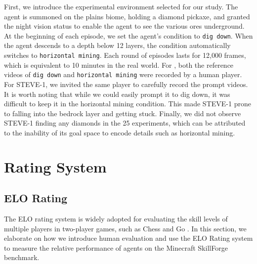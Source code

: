 \documentclass[11pt, a4paper, logo, one column]{craftjarvis}
\begin{document}
First, we introduce the experimental environment selected for our study. The agent is summoned on the plains biome, holding a diamond pickaxe, and granted the night vision status to enable the agent to see the various ores underground. At the beginning of each episode, we set the agent's condition to \texttt{dig down}. When the agent descends to a depth below 12 layers, the condition automatically switches to \texttt{horizontal mining}. Each round of episodes lasts for 12,000 frames, which is equivalent to 10 minutes in the real world. For \agent, both the reference videos of \texttt{dig down} and \texttt{horizontal mining} were recorded by a human player. For STEVE-1, we invited the same player to carefully record the prompt videos. It is worth noting that while we could easily prompt it to dig down, it was difficult to keep it in the horizontal mining condition. This made STEVE-1 prone to falling into the bedrock layer and getting stuck. Finally, we did not observe STEVE-1 finding any diamonds in the 25 experiments, which can be attributed to the inability of its goal space to encode details such as horizontal mining. 


\section{Rating System} \label{appendix:elo}

\subsection{ELO Rating}

The ELO rating system is widely adopted for evaluating the skill levels of multiple players in two-player games, such as Chess and Go \citep{alphago}. In this section, we elaborate on how we introduce human evaluation and use the ELO Rating system to measure the relative performance of agents on the Minecraft SkillForge benchmark. 
\end{document}
